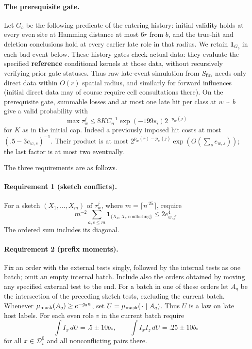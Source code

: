 \paragraph{The prerequisite gate.}
Let \(G_b\) be the following predicate of the entering history: initial
validity holds at every even site at Hamming distance at most \(6r\)
from \(b\), and the true-hit and deletion conclusions hold at every
earlier late role in that radius. We retain \(\mathbf1_{G_b}\) in each
bad event below. These history gates check actual data:
they evaluate the specified \textbf{reference} conditional kernels at
those data, without recursively verifying prior gate statuses. Thus raw
late-event simulation from \(S_{\rm fin}\) needs only direct data within
\(O(r)\) spatial radius, and similarly for forward influences (initial
direct data may of course require cell consultations there). On the
prerequisite gate, summable losses and at most one late hit per class at
\(w\sim b\) give a valid probability with
\begin{equation}
 \max\tau_w^j\le 8K C_n^{-1}\exp(-199s_i)2^{-p_w(j)}                   \label{eq:source-25}
\end{equation}
for \(K\) as in the initial cap. Indeed a previously imposed hit costs
at most \((.5-3e_{w,s})^{-1}\). Their product is at most
\(2^{p_w(r)-p_w(j)}\exp(O(\sum_s e_{w,s}))\); the last factor is at
most two eventually.

The three requirements are as follows.
\paragraph{Requirement 1 (sketch conflicts).}
For a sketch \((X_1,\ldots,X_m)\) of \(\tau_w^j\), where
\(m=\lceil n^{.25}\rceil\), require
\[
 m^{-2}\sum_{a,c\le m}\mathbf1_{\{X_a,X_c\text{ conflicting}\}}
 \le2e_{w,j}^4.
\]
The ordered sum includes its diagonal.
\paragraph{Requirement 2 (prefix moments).}
Fix an order with the external tests singly, followed by the internal
tests as one batch; omit an empty internal batch. Include also the orders
obtained by moving any specified external test to the end. For a batch
in one of these orders let \(A_q\) be the intersection of the preceding
sketch tests, excluding the current batch. Whenever
\(\mu_{\rm mask}(A_q)\ge e^{-g_0n}\), set
\(U=\mu_{\rm mask}(\,\cdot\mid A_q)\). Thus \(U\) is a law on
late host labels. For each even role \(v\) in the current batch
require
\begin{equation}
 \int I_x\,dU=.5\pm10 b_*,\qquad \int I_x I_z\,dU=.25\pm10 b_*         \label{eq:source-26}
\end{equation}
for all \(x\in\mathcal D_v^0\) and all nonconflicting pairs there.
